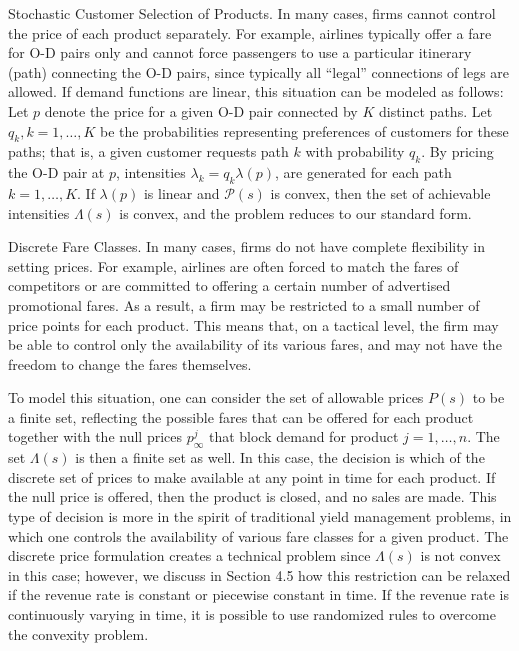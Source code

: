 Stochastic Customer Selection of Products. In many cases, firms cannot control the price of each product separately. For example, airlines typically offer a fare for O-D pairs only and cannot force passengers to use a particular itinerary (path) connecting the O-D pairs, since typically all ``legal'' connections of legs are allowed. If demand functions are linear, this situation can be modeled as follows: Let \(p\) denote the price for a given O-D pair connected by \(K\) distinct paths. Let \(q _ { k } , k = 1 , \ldots , K\) be the probabilities representing preferences of customers for these paths; that is, a given customer requests path \(k\) with probability \(q _ { k }\). By pricing the O-D pair at \(p\), intensities \(\lambda _ { k } = q _ { k } \lambda ( p )\), are generated for each path \(k = 1 , \ldots , K .\) If \(\lambda ( p )\) is linear and \(\mathcal { P } ( s )\) is convex, then the set of achievable intensities \(\Lambda ( s )\) is convex, and the problem reduces to our standard form.

Discrete Fare Classes. In many cases, firms do not have complete flexibility in setting prices. For example, airlines are often forced to match the fares of competitors or are committed to offering a certain number of advertised promotional fares. As a result, a firm may be restricted to a small number of price points for each product. This means that, on a tactical level, the firm may be able to control only the availability of its various fares, and may not have the freedom to change the fares themselves.

To model this situation, one can consider the set of allowable prices \(P ( s )\) to be a finite set, reflecting the possible fares that can be offered for each product together with the null prices \(p _ { \infty } ^ { j }\) that block demand for product \(j = 1 , \ldots , n\). The set \(\Lambda ( s )\) is then a finite set as well. In this case, the decision is which of the discrete set of prices to make available at any point in time for each product. If the null price is offered, then the product is closed, and no sales are made. This type of decision is more in the spirit of traditional yield management problems, in which one controls the availability of various fare classes for a given product. The discrete price formulation creates a technical problem since \(\Lambda ( s )\) is not convex in this case; however, we discuss in Section 4.5 how this restriction can be relaxed if the revenue rate is constant or piecewise constant in time. If the revenue rate is continuously varying in time, it is possible to use randomized rules to overcome the convexity problem.

